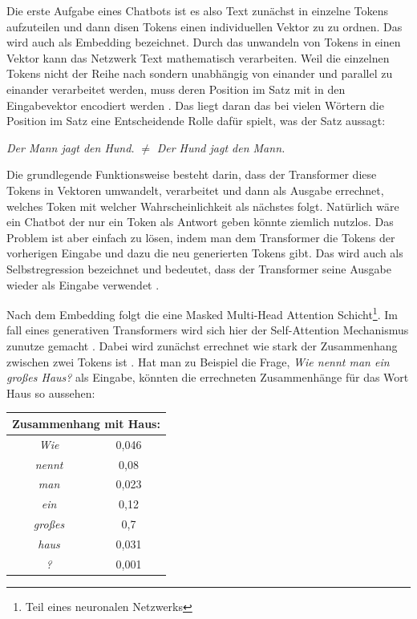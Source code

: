 	
	Die erste Aufgabe eines Chatbots ist es also Text zunächst in einzelne Tokens aufzuteilen und dann disen Tokens 
	einen individuellen Vektor zu zu ordnen. Das wird auch als Embedding bezeichnet. Durch das unwandeln von Tokens in 
	einen Vektor kann das Netzwerk Text mathematisch verarbeiten. Weil die einzelnen Tokens nicht der Reihe nach sondern 
	unabhängig von einander und parallel zu einander verarbeitet werden, muss deren Position im Satz mit in den Eingabevektor 
	encodiert werden \cite[S. 2f]{vaswani2017}. Das liegt daran das bei vielen Wörtern die Position im Satz eine 
	Entscheidende Rolle dafür spielt, was der Satz aussagt:

	\vspace{3mm}
	\emph{Der Mann jagt den Hund.} 	
	\space $\neq$ \space
	\emph{Der Hund jagt den Mann.}
	
	\clearpage
	\noindent
	Die grundlegende Funktionsweise besteht darin, dass der Transformer diese Tokens in Vektoren umwandelt, verarbeitet und dann 
	als Ausgabe errechnet, welches Token mit welcher Wahrscheinlichkeit als nächstes folgt. Natürlich wäre ein Chatbot der nur
	ein Token als Antwort geben könnte ziemlich nutzlos. Das Problem ist aber einfach zu lösen, indem man dem Transformer
	die Tokens der vorherigen Eingabe und dazu die neu generierten Tokens gibt. Das wird auch als Selbstregression bezeichnet und 
	bedeutet, dass der Transformer seine Ausgabe wieder als Eingabe verwendet \cite[S. 2]{vaswani2017}.  

	Nach dem Embedding folgt die eine Masked Multi-Head Attention Schicht\footnote{Teil eines neuronalen Netzwerks}.
	Im fall eines generativen Transformers wird sich hier der  Self-Attention Mechanismus zunutze gemacht \cite[S. 2f]{turner2024}. 
	Dabei wird zunächst errechnet wie stark der Zusammenhang zwischen zwei Tokens ist \cite[S. 4]{vaswani2017}. Hat man zu 
	Beispiel die Frage, \emph{Wie nennt man ein großes Haus?} als Eingabe, könnten die errechneten Zusammenhänge für das 
	Wort Haus so aussehen: 
	
	\vspace{5mm}
	\begin{tabular}{ |c|c| }
  		\hline
	  	\multicolumn{2}{|c|}{Zusammenhang mit Haus: } \\
	  	\hline
	  	\emph{Wie} & 0,046 \\
	  	\hline
	  	\emph{nennt} & 0,08 \\
		\hline
	  	\emph{man} & 0,023 \\
	  	\hline
		\emph{ein} & 0,12 \\
	  	\hline
		\emph{großes} & 0,7 \\
	  	\hline
		\emph{haus} & 0,031 \\
		\hline
		\emph{?} & 0,001 \\
		\hline
	\end{tabular}
	\vspace{5mm}
	
